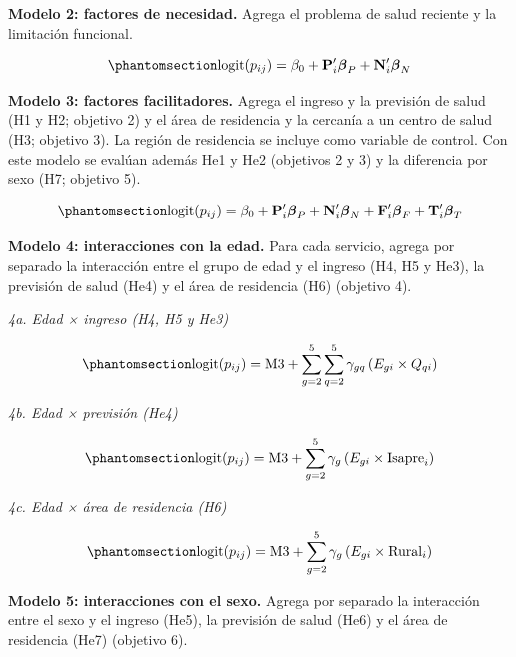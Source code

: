 \documentclass[
  spanish,
  a4paper,
  oneside]{scrbook}
\begin{document}
\textbf{Modelo 2: factores de necesidad.} Agrega el problema de salud
reciente y la limitación funcional.

\begin{equation}\protect\phantomsection\label{eq-m2}{
\text{logit}(p_{ij}) = \beta_0 + \mathbf{P}_i'\boldsymbol{\beta}_P + \mathbf{N}_i'\boldsymbol{\beta}_N
}\end{equation}

\textbf{Modelo 3: factores facilitadores.} Agrega el ingreso y la
previsión de salud (H1 y H2; objetivo 2) y el área de residencia y la
cercanía a un centro de salud (H3; objetivo 3). La región de residencia
se incluye como variable de control. Con este modelo se evalúan además
He1 y He2 (objetivos 2 y 3) y la diferencia por sexo (H7; objetivo 5).

\begin{equation}\protect\phantomsection\label{eq-m3}{
\text{logit}(p_{ij}) = \beta_0 + \mathbf{P}_i'\boldsymbol{\beta}_P + \mathbf{N}_i'\boldsymbol{\beta}_N + \mathbf{F}_i'\boldsymbol{\beta}_F + \mathbf{T}_i'\boldsymbol{\beta}_T
}\end{equation}

\textbf{Modelo 4: interacciones con la edad.} Para cada servicio, agrega
por separado la interacción entre el grupo de edad y el ingreso (H4, H5
y He3), la previsión de salud (He4) y el área de residencia (H6)
(objetivo 4).

\emph{4a. Edad × ingreso (H4, H5 y He3)}

\begin{equation}\protect\phantomsection\label{eq-m4a}{
\text{logit}(p_{ij}) = \text{M3} + \sum_{g=2}^{5}\sum_{q=2}^{5}\gamma_{gq}\,(E_{gi}\times Q_{qi})
}\end{equation}

\emph{4b. Edad × previsión (He4)}

\begin{equation}\protect\phantomsection\label{eq-m4b}{
\text{logit}(p_{ij}) = \text{M3} + \sum_{g=2}^{5}\gamma_{g}\,(E_{gi}\times \text{Isapre}_i)
}\end{equation}

\emph{4c. Edad × área de residencia (H6)}

\begin{equation}\protect\phantomsection\label{eq-m4c}{
\text{logit}(p_{ij}) = \text{M3} + \sum_{g=2}^{5}\gamma_{g}\,(E_{gi}\times \text{Rural}_i)
}\end{equation}

\textbf{Modelo 5: interacciones con el sexo.} Agrega por separado la
interacción entre el sexo y el ingreso (He5), la previsión de salud
(He6) y el área de residencia (He7) (objetivo 6).
\end{document}

